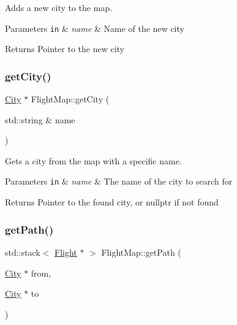 Adds a new city to the map. 


\begin{DoxyParams}[1]{Parameters}
\mbox{\tt in}  & {\em name} & Name of the new city\\
\hline
\end{DoxyParams}
\begin{DoxyReturn}{Returns}
Pointer to the new city 
\end{DoxyReturn}
\mbox{\label{class_flight_map_a96d6d4164fa2a37584863a5e27d42fe3}} 
\subsubsection{\texorpdfstring{get\+City()}{getCity()}}
{\footnotesize\ttfamily \hyperlink{struct_city}{City} $\ast$ Flight\+Map\+::get\+City (\begin{DoxyParamCaption}\item[{std\+::string \&}]{name }\end{DoxyParamCaption})}



Gets a city from the map with a specific name. 


\begin{DoxyParams}[1]{Parameters}
\mbox{\tt in}  & {\em name} & The name of the city to search for\\
\hline
\end{DoxyParams}
\begin{DoxyReturn}{Returns}
Pointer to the found city, or nullptr if not found 
\end{DoxyReturn}
\mbox{\label{class_flight_map_a91f8ec291a0305ddccc64dd208e34113}} 
\subsubsection{\texorpdfstring{get\+Path()}{getPath()}}
{\footnotesize\ttfamily std\+::stack$<$ \hyperlink{struct_flight}{Flight} $\ast$ $>$ Flight\+Map\+::get\+Path (\begin{DoxyParamCaption}\item[{\hyperlink{struct_city}{City} $\ast$}]{from,  }\item[{\hyperlink{struct_city}{City} $\ast$}]{to }\end{DoxyParamCaption})}



